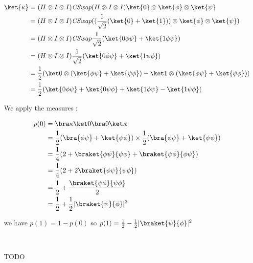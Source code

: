 \begin{align*}
  \ket{\kappa}&=(H \otimes I \otimes I) \CSwap (H \otimes I \otimes I) \ket{0} \otimes
  \ket{\phi} \otimes \ket{\psi} \\
  &= (H \otimes I \otimes I) \CSwap ((\frac{1}{\sqrt 2}(\ket{0} + \ket{1}))
  \otimes \ket{\phi} \otimes \ket{\psi}) \\
  &= (H \otimes I \otimes I) \CSwap \frac{1}{\sqrt 2}
     (\ket{0\phi\psi} + \ket{1\phi\psi}) \\
  &= (H \otimes I \otimes I)\frac{1}{\sqrt 2}
     (\ket{0\phi\psi} + \ket{1\psi\phi}) \\
  &= \frac 1 2(\ket 0 \otimes (\ket{\phi\psi} + \ket{\psi\phi}) -
               \ket 1 \otimes (\ket{\phi\psi} + \ket{\psi\phi})) \\
  &= \frac 1 2(\ket{0\phi\psi} + \ket{0\psi\phi} +
               \ket{1\phi\psi} - \ket{1\psi\phi})
\end{align*}

We apply the measures :

\begin{align*}
  p(0) &= \bra \kappa \ket 0 \bra 0 \ket \kappa \\
  &= \frac 1 2 (\bra{\phi\psi} + \ket{\psi\phi}) \times
     \frac 1 2 (\bra{\phi\psi} + \ket{\psi\phi}) \\
  &= \frac 1 4 (2 + \braket{\phi\psi}{\psi\phi} + \braket{\psi\phi}{\phi\psi})\\
  &= \frac 1 4 (2 + 2\braket{\phi\psi}{\psi\phi})\\
  &= \frac 1 2 + \frac{\braket{\psi\phi}{\psi\phi}}{2}\\
  &= \frac 1 2 + \frac 1 2 |\braket{\psi}{\phi}|^2\\
\end{align*}

we have $p(1) = 1 - p(0)$ so $p(1) = \frac 1 2 - \frac 1 2
|\braket{\psi}{\phi}|^2$

~

TODO


